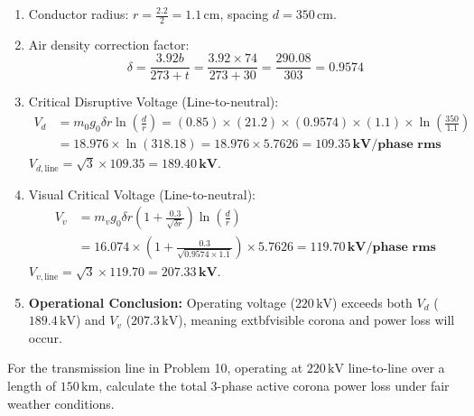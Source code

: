 \documentclass[11pt,a4paper]{article}
\newenvironment{Problem}[1][Numerical Problem]{\begin{tcolorbox}[problembox, title=#1]}{\end{tcolorbox}}
\newenvironment{Solution}[1][Step-by-Step Solution]{\begin{tcolorbox}[solbox, title=#1]}{\end{tcolorbox}}
\begin{document}
\begin{Solution}
\begin{enumerate}
  \item Conductor radius: $r = \frac{2.2}{2} = 1.1\,\text{cm}$, spacing $d = 350\,\text{cm}$.
  \item Air density correction factor:
    \begin{equation*}
      \delta = \frac{3.92 b}{273 + t} = \frac{3.92 \times 74}{273 + 30} = \frac{290.08}{303} = \mathbf{0.9574}
    \end{equation*}
  \item Critical Disruptive Voltage (Line-to-neutral):
    \begin{align*}
      V_d &= m_0 g_0 \delta r \ln\left(\frac{d}{r}\right) = (0.85) \times (21.2) \times (0.9574) \times (1.1) \times \ln\left(\frac{350}{1.1}\right) \\
          &= 18.976 \times \ln(318.18) = 18.976 \times 5.7626 = \mathbf{109.35\,\text{kV/phase rms}}
    \end{align*}
    $V_{d,\text{line}} = \sqrt{3} \times 109.35 = \mathbf{189.40\,\text{kV}}$.
  \item Visual Critical Voltage (Line-to-neutral):
    \begin{align*}
      V_v &= m_v g_0 \delta r \left( 1 + \frac{0.3}{\sqrt{\delta r}} \right) \ln\left(\frac{d}{r}\right) \\
          &= 16.074 \times \left( 1 + \frac{0.3}{\sqrt{0.9574 \times 1.1}} \right) \times 5.7626 = \mathbf{119.70\,\text{kV/phase rms}}
    \end{align*}
    $V_{v,\text{line}} = \sqrt{3} \times 119.70 = \mathbf{207.33\,\text{kV}}$.
  \item \textbf{Operational Conclusion:} Operating voltage ($220\,\text{kV}$) exceeds both $V_d$ ($189.4\,\text{kV}$) and $V_v$ ($207.3\,\text{kV}$), meaning 	extbf{visible corona and power loss will occur}.
\end{enumerate}
\end{Solution}

\begin{Problem}[Problem 11: Corona Power Loss Evaluation using Peek's Formula]
For the transmission line in Problem 10, operating at $220\,\text{kV}$ line-to-line over a length of $150\,\text{km}$, calculate the total 3-phase active corona power loss under fair weather conditions.
\end{Problem}
\end{document}
